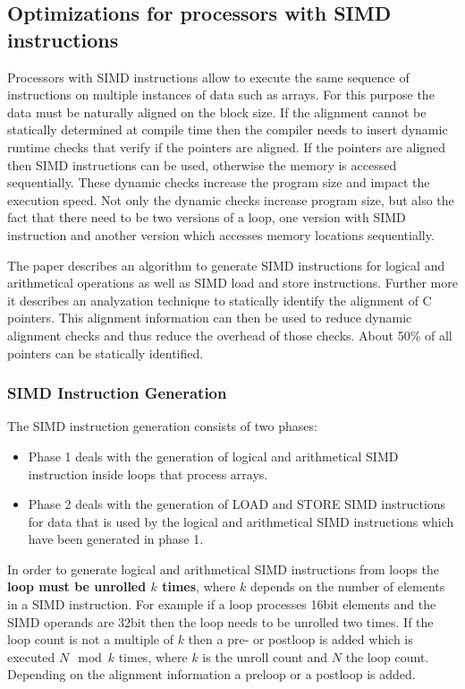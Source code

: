 \documentclass[a4paper,10pt]{article}
\begin{document}
\subsection{Optimizations for processors with SIMD instructions}
Processors with SIMD instructions allow to execute the same sequence of instructions on multiple instances of data such as arrays. For
this purpose the data must be naturally aligned on the block size. If the alignment cannot be statically determined at compile time
then the compiler needs to insert dynamic runtime checks that verify if the pointers are aligned. If the pointers are aligned then
SIMD instructions can be used, otherwise the memory is accessed sequentially. These dynamic checks increase the program size and impact
the execution speed. Not only the dynamic checks increase program size, but also the fact that there need to be two versions of a loop,
one version with SIMD instruction and another version which accesses memory locations sequentially.

The paper describes an algorithm to generate SIMD instructions for logical and arithmetical operations as well as SIMD load and
store instructions. Further more it describes an analyzation technique to statically identify the alignment of C pointers.
This alignment information can then be used to reduce dynamic alignment checks and thus reduce the overhead of those checks.
About 50\% of all pointers can be statically identified.

\subsubsection{SIMD Instruction Generation}
The SIMD instruction generation consists of two phases:
\begin{itemize}
 \item Phase 1 deals with the generation of logical and arithmetical SIMD instruction inside loops that process arrays.
 \item Phase 2 deals with the generation of LOAD and STORE SIMD instructions for data that is used by the logical and arithmetical SIMD
       instructions which have been generated in phase 1.
\end{itemize}

In order to generate logical and arithmetical SIMD instructions from loops the \textbf{loop must be unrolled $k$ times}, where $k$
depends on the number of elements in a SIMD instruction. For example if a loop processes 16bit elements and the SIMD operands are 32bit
then the loop needs to be unrolled two times. If the loop count is not a multiple of $k$ then a pre- or postloop is added which is
executed $N \mod k$ times, where $k$ is the unroll count and $N$ the loop count. Depending on the alignment information a preloop or
a postloop is added.
\end{document}
